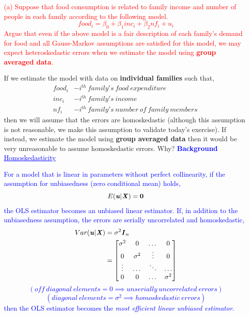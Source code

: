 \documentclass[12pt]{report}
\newenvironment{blueframed}[1][blue]
{\def\FrameCommand{\fboxsep=\FrameSep\fcolorbox{#1}{white}}%
\MakeFramed {\advance\hsize-\width \FrameRestore}}
{\endMakeFramed}
\begin{document}
\noindent \textcolor{red}
{
	(a) Suppose that food consumption is related to family income and number of people in each family according to the following model.
	$$food_i = \beta_0 + \beta_1inc_i + \beta_2nf_i + u_i$$
	Argue that even if the above model is a fair description of each family's demand for food and all Gauss-Markov assumptions are satisfied for this model, we may expect heteroskedastic errors when we estimate the model using \textbf{group averaged data}.	
}

\noindent If we estimate the model with data on \textbf{individual families} such that,
\begin{align*}
food_i &- i^{th}\ family's\ food\ expenditure\ \\
inc_i &- i^{th}\ family's\ income\ \\
nf_i &- i^{th}\ family's\ number\ of\ family\ members\
\end{align*}
\noindent then we will assume that the errors are homoskedastic (although this assumption is not reasonable, we make this assumption to validate today's exercise). If instead, we estimate the model using \textbf{group averaged data} then it would be very unreasonable to assume homoskedastic errors. Why?
\justify
\begin{blueframed}
	\textcolor{blue}{\textbf{Background}}
	\vspace{-\baselineskip}
	\justify
	\textcolor{blue}{\underline{Homoskedasticity}}
	
	\noindent \textcolor{blue}
	{
		For a model that is linear in parameters without perfect collinearity, if the assumption for unbiasedness (zero conditional mean) holds, $$E(\textbf{\textit{u}}|\textbf{\textit{X}}) = \textbf{0}$$ the OLS estimator becomes an unbiased linear estimator. If, in addition to the unbiasedness assumption, the errors are serially uncorrelated and homoskedastic, \begin{align*}
		Var(\textbf{\textit{u}}|\textbf{\textit{X}}) &= \sigma^2\textbf{\textit{I}}_n \\
		&=\begin{bmatrix}
		\sigma^2 & 0 & \dots & 0 \\
		0 & \sigma^2 & \vdots & 0 \\
		\vdots & \dots & \ddots & \dots \\
		0 & 0 & \dots & \sigma^2
		\end{bmatrix}
		\end{align*} $$(off\ diagonal\ elements = 0 \implies unserially\ uncorrelated\ errors)$$ $$(diagonal\ elements = \sigma^2 \implies homoskedastic\ errors)$$ then the OLS estimator becomes the \textit{most efficient linear unbiased estimator}. 
	}
\end{blueframed}
\end{document}
